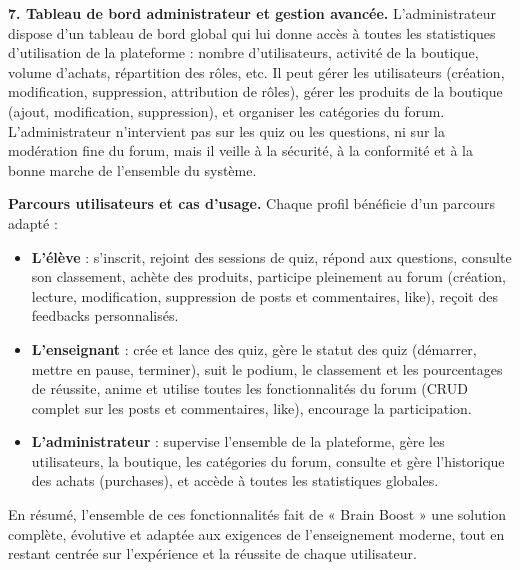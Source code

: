 \documentclass[a4paper,11pt]{report}
\begin{document}
\textbf{7. Tableau de bord administrateur et gestion avancée.} L'administrateur dispose d'un tableau de bord global qui lui donne accès à toutes les statistiques d'utilisation de la plateforme : nombre d'utilisateurs, activité de la boutique, volume d'achats, répartition des rôles, etc. Il peut gérer les utilisateurs (création, modification, suppression, attribution de rôles), gérer les produits de la boutique (ajout, modification, suppression), et organiser les catégories du forum. L'administrateur n'intervient pas sur les quiz ou les questions, ni sur la modération fine du forum, mais il veille à la sécurité, à la conformité et à la bonne marche de l'ensemble du système.

\textbf{Parcours utilisateurs et cas d'usage.} Chaque profil bénéficie d'un parcours adapté :
\begin{itemize}
    \item \textbf{L'élève} : s'inscrit, rejoint des sessions de quiz, répond aux questions, consulte son classement, achète des produits, participe pleinement au forum (création, lecture, modification, suppression de posts et commentaires, like), reçoit des feedbacks personnalisés.
    \item \textbf{L'enseignant} : crée et lance des quiz, gère le statut des quiz (démarrer, mettre en pause, terminer), suit le podium, le classement et les pourcentages de réussite, anime et utilise toutes les fonctionnalités du forum (CRUD complet sur les posts et commentaires, like), encourage la participation.
    \item \textbf{L'administrateur} : supervise l'ensemble de la plateforme, gère les utilisateurs, la boutique, les catégories du forum, consulte et gère l'historique des achats (purchases), et accède à toutes les statistiques globales.
\end{itemize}

En résumé, l'ensemble de ces fonctionnalités fait de « Brain Boost » une solution complète, évolutive et adaptée aux exigences de l'enseignement moderne, tout en restant centrée sur l'expérience et la réussite de chaque utilisateur.
\end{document}

